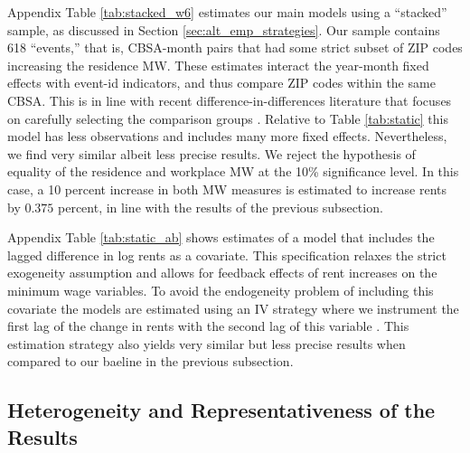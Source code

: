 Appendix Table \ref{tab:stacked_w6} estimates our main models using a 
``stacked'' sample, as discussed in Section \ref{sec:alt_emp_strategies}.
Our sample contains 618 ``events,'' that is, CBSA-month pairs that had some 
strict subset of ZIP codes increasing the residence MW.
These estimates interact the year-month fixed effects with event-id indicators, 
and thus compare ZIP codes within the same CBSA.
This is in line with recent difference-in-differences literature that 
focuses on carefully selecting the comparison groups 
\parencite{CallawayEtAl2021, deChaisemartinEtAl2022, RothEtAl2022}.
Relative to Table \ref{tab:static} this model has less observations and includes 
many more fixed effects.
Nevertheless, we find very similar albeit less precise results.
We reject the hypothesis of equality of the residence and workplace MW at the
10\% significance level.
In this case, a 10 percent increase in both MW measures is estimated to 
increase rents by $0.375$ percent, in line with the results of the previous 
subsection.

Appendix Table \ref{tab:static_ab} shows estimates of a model that includes
the lagged difference in log rents as a covariate.
This specification relaxes the strict exogeneity assumption and allows for 
feedback effects of rent increases on the minimum wage variables.
To avoid the endogeneity problem of including this covariate the models are 
estimated using an IV strategy where we instrument the first lag of the change 
in rents with the second lag of this variable 
\parencite{ArellanoBond1991,ArellanoHonore2001}.
This estimation strategy also yields very similar but less precise results
when compared to our baeline in the previous subsection.

\subsection{Heterogeneity and Representativeness of the Results}
\label{sec:results_heterogeneity}


